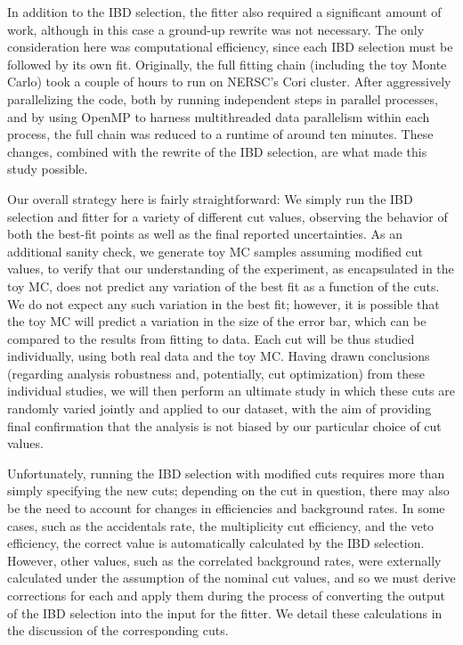 \documentclass[../thesis.tex]{subfiles}
\begin{document}
In addition to the IBD selection, the fitter also required a significant amount of work, although in this case a ground-up rewrite was not necessary. The only consideration here was computational efficiency, since each IBD selection must be followed by its own fit. Originally, the full fitting chain (including the toy Monte Carlo) took a couple of hours to run on NERSC's Cori cluster. After aggressively parallelizing the code, both by running independent steps in parallel processes, and by using OpenMP to harness multithreaded data parallelism within each process, the full chain was reduced to a runtime of around ten minutes. These changes, combined with the rewrite of the IBD selection, are what made this study possible.

Our overall strategy here is fairly straightforward: We simply run the IBD selection and fitter for a variety of different cut values, observing the behavior of both the best-fit points as well as the final reported uncertainties. As an additional sanity check, we generate toy MC samples assuming modified cut values, to verify that our understanding of the experiment, as encapsulated in the toy MC, does not predict any variation of the best fit as a function of the cuts. We do not expect any such variation in the best fit; however, it is possible that the toy MC will predict a variation in the size of the error bar, which can be compared to the results from fitting to data. Each cut will be thus studied individually, using both real data and the toy MC\@. Having drawn conclusions (regarding analysis robustness and, potentially, cut optimization) from these individual studies, we will then perform an ultimate study in which these cuts are randomly varied jointly and applied to our dataset, with the aim of providing final confirmation that the analysis is not biased by our particular choice of cut values.

Unfortunately, running the IBD selection with modified cuts requires more than simply specifying the new cuts; depending on the cut in question, there may also be the need to account for changes in efficiencies and background rates. In some cases, such as the accidentals rate, the multiplicity cut efficiency, and the veto efficiency, the correct value is automatically calculated by the IBD selection. However, other values, such as the correlated background rates, were externally calculated under the assumption of the nominal cut values, and so we must derive corrections for each and apply them during the process of converting the output of the IBD selection into the input for the fitter. We detail these calculations in the discussion of the corresponding cuts.
\end{document}
